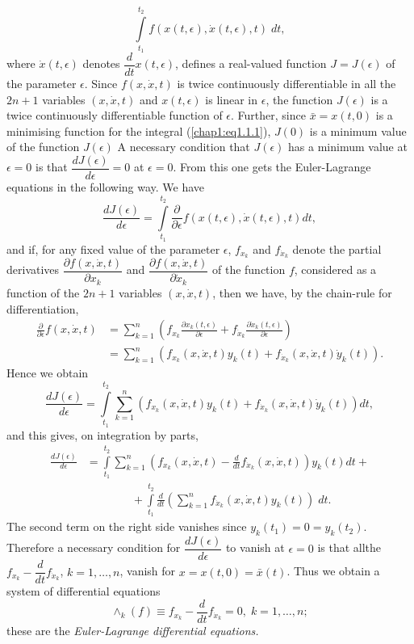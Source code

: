 $$
\int\limits^{t_2}_{t_1} f(x(t, \epsilon), \dot{x}(t, \epsilon), t) \; dt,
$$
where $\dot{x}(t, \epsilon)$ denotes $\dfrac{d}{dt} x (t, \epsilon)$, defines a real-valued function $J = J(\epsilon)$ of the parameter $\epsilon$. Since $f(x, \dot{x},t)$ is twice continuously differentiable in all the $2n+1$ variables $(x,\dot{x},t)$ and $x(t, \epsilon)$ is linear in $\epsilon$, the function $J(\epsilon)$ is a twice continuously differentiable function of $\epsilon$. Further, since $\bar{x} = x(t,0)$ is a minimising function for the integral (\ref{chap1:eq1.1.1}), $J(0)$ is a minimum value of the function $J(\epsilon)$ A necessary condition that $J(\epsilon)$ has a minimum value at $\epsilon = 0$ is that $\dfrac{dJ(\epsilon)}{d\epsilon} =0$ at $\epsilon = 0$. From this one gets the Euler-Lagrange equations in the following way. We have
$$
\frac{dJ(\epsilon)}{d\epsilon} = \int\limits^{t_2}_{t_1} \frac{\partial}{\partial\epsilon} f(x(t, \epsilon), \dot{x}(t, \epsilon), t) dt,
$$\pageoriginale
and if, for any fixed value of the parameter $\epsilon$, $f_{x_k}$ and $f_{\dot{x}_k}$ denote the partial derivatives $\dfrac{\partial f(x, \dot{x},t)}{\partial x_k}$ and $\dfrac{\partial f (x,\dot{x}, t)}{\partial \dot{x}_k}$ of the function $f$, considered as a function of the $2n+1$ variables $(x,\dot{x}, t)$, then we have, by the chain-rule for differentiation,
\begin{align*}
\frac{\partial}{\partial \epsilon} f(x, \dot{x},t) & = \sum\limits^n_{k=1} (f_{x_k} \frac{\partial x_k(t, \epsilon)}{\partial \epsilon} + f_{\dot{x}_k} \frac{\partial \dot{x}_k (t, \epsilon)}{\partial \epsilon})\\
& = \sum^n_{k=1} (f_{x_k } (x, \dot{x}, t) y_k(t) + f_{\dot{x}_k} (x,\dot{x},t) \dot{y}_k (t)). 
\end{align*}
Hence we obtain
$$
\frac{dJ(\epsilon)}{d\epsilon} = \int\limits^{t_2}_{t_1} \sum\limits^n_{k=1} (f_{x_k} (x, \dot{x}, t) y_k (t) + f_{\dot{x}_k} (x, \dot{x}, t) \dot{y}_k (t)) dt,
$$
and this gives, on integration by parts, 
\begin{align*}
\frac{dJ(\epsilon)}{d\epsilon} & = \int\limits^{t_2}_{t_1} \sum\limits^n_{k=1} (f_{x_k} (x, \dot{x} , t) - \frac{d}{dt} f_{\dot{x}_k} (x,\dot{x}, t) ) y_k (t) dt+\\
& \qquad \qquad + \int\limits^{t_2}_{t_1} \frac{d}{dt} \left(\sum\limits^n_{k=1} f_{\dot{x}_k} (x, \dot{x}, t) y_k(t) \right) \; dt. 
\end{align*}
The second term on the right side vanishes since $y_k (t_1) = 0 = y_k (t_2)$. Therefore a necessary condition for $\dfrac{dJ(\epsilon)}{d\epsilon}$ to vanish at $\epsilon = 0$ is that all\pageoriginale the $f_{x_k} - \dfrac{d}{dt} f_{\dot{x}_k}$, $k =1 , \ldots, n$, vanish for $x= x(t,0) = \bar{x}(t)$. Thus we obtain a system of differential equations
\begin{equation*}
\wedge_k (f) \equiv f_{x_k} - \frac{d}{dt} f_{\dot{x}_k} = 0, \; k = 1, \ldots, n; 
\tag{1.1.2}\label{chap1:eq1.1.2}
\end{equation*}
these are the {\em Euler-Lagrange differential equations.}

